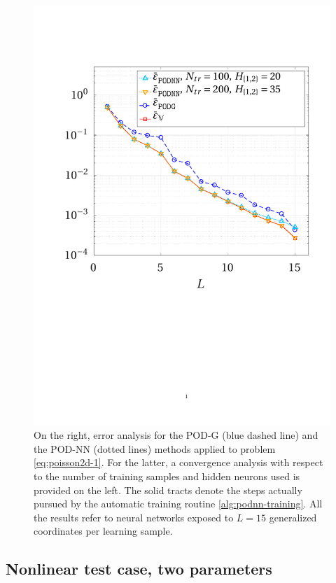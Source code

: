 \documentclass[12pt, a4paper, twoside, openright, notitlepage]{report}
\numberwithin{equation}{chapter}
\theoremstyle{theorem}
\theoremstyle{definition}
\theoremstyle{remark}
\theoremstyle{proposition}
\numberwithin{figure}{chapter}
\begin{document}
\begin{figure}[H]
			\includegraphics[scale = 0.39, trim = {1.5cm 9cm 1.5cm 3.5cm}, clip]{poisson2d_1_error_vs_rank}
			
			\caption{On the right, error analysis for the POD-G (blue dashed line) and the POD-NN (dotted lines) methods applied to problem \eqref{eq:poisson2d-1}. For the latter, a convergence analysis with respect to the number of training samples and hidden neurons used is provided on the left. The solid tracts denote the steps actually pursued by the automatic training routine \ref{alg:podnn-training}. All the results refer to neural networks exposed to $L = 15$ generalized coordinates per learning sample.}
			\label{fig:poisson2d-1-fig2}
		\end{figure}
		
	\subsection{Nonlinear test case, two parameters}
	\label{section:poisson2d-2}
	
\end{document}
